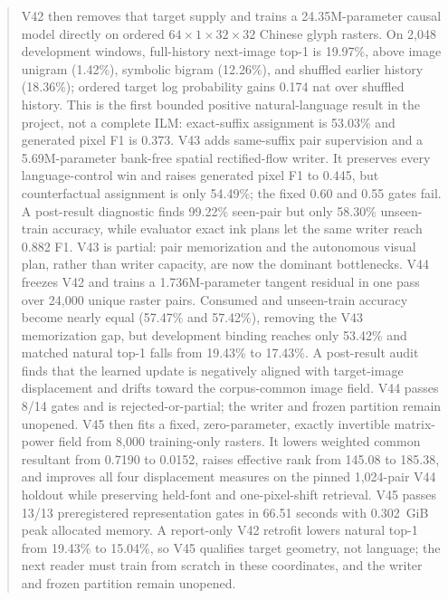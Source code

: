 \documentclass[11pt]{article}
\begin{document}
\begin{abstract}
V42 then removes that target supply and trains a 24.35M-parameter causal model
directly on ordered $64\times1\times32\times32$ Chinese glyph rasters. On 2,048
development windows, full-history next-image top-1 is 19.97\%, above image
unigram (1.42\%), symbolic bigram (12.26\%), and shuffled earlier history
(18.36\%); ordered target log probability gains 0.174 nat over shuffled
history. This is the first bounded positive natural-language result in the
project, not a complete ILM: exact-suffix assignment is 53.03\% and generated
pixel F1 is 0.373. V43 adds same-suffix pair supervision and a 5.69M-parameter
bank-free spatial rectified-flow writer. It preserves every language-control
win and raises generated pixel F1 to 0.445, but counterfactual assignment is
only 54.49\%; the fixed 0.60 and 0.55 gates fail. A post-result diagnostic finds
99.22\% seen-pair but only 58.30\% unseen-train accuracy, while evaluator exact
ink plans let the same writer reach 0.882 F1. V43 is partial: pair memorization
and the autonomous visual plan, rather than writer capacity, are now the
dominant bottlenecks. V44 freezes V42 and trains a 1.736M-parameter tangent
residual in one pass over 24,000 unique raster pairs. Consumed and unseen-train
accuracy become nearly equal (57.47\% and 57.42\%), removing the V43 memorization
gap, but development binding reaches only 53.42\% and matched natural top-1
falls from 19.43\% to 17.43\%. A post-result audit finds that the learned update
is negatively aligned with target-image displacement and drifts toward the
corpus-common image field. V44 passes 8/14 gates and is rejected-or-partial;
the writer and frozen partition remain unopened. V45 then fits a fixed,
zero-parameter, exactly invertible matrix-power field from 8,000 training-only
rasters. It lowers weighted common resultant from 0.7190 to 0.0152, raises
effective rank from 145.08 to 185.38, and improves all four displacement
measures on the pinned 1,024-pair V44 holdout while preserving held-font and
one-pixel-shift retrieval. V45 passes 13/13 preregistered representation gates
in 66.51 seconds with 0.302~GiB peak allocated memory. A report-only V42
retrofit lowers natural top-1 from 19.43\% to 15.04\%, so V45 qualifies target
geometry, not language; the next reader must train from scratch in these
coordinates, and the writer and frozen partition remain unopened.


\end{abstract}
\end{document}
